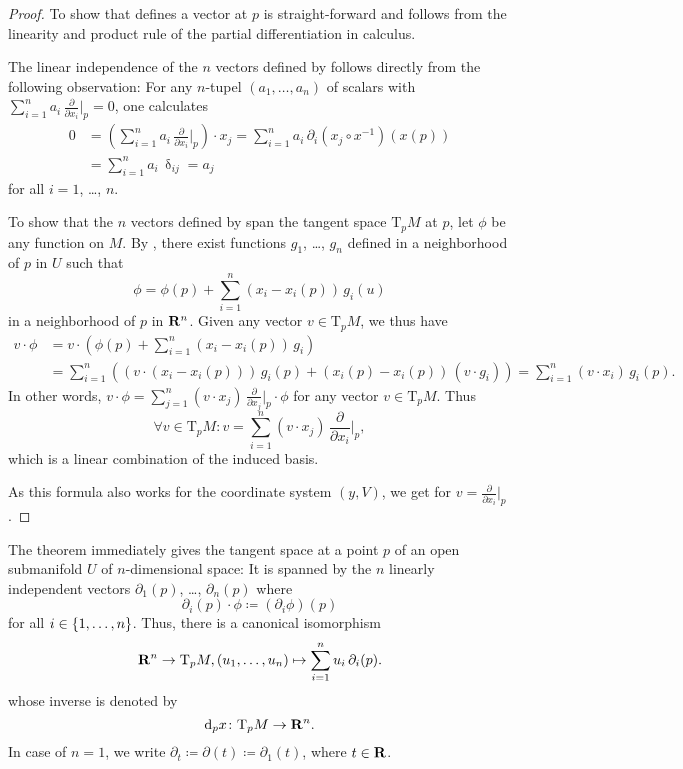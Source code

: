 \begin{proof}
  To show that  defines a vector at $p$ is
  straight-forward and follows from the linearity and product rule of the
  partial differentiation in calculus.
  
  The linear independence of the $n$ vectors defined by
   follows directly from the following
  observation: For any $n$-tupel $(a_1, \dotsc, a_n)$ of
  scalars with $\sum_{i = 1}^n a_i \, \frac\partial{\partial x_i}|_p = 0$, one
  calculates
  \[
    \begin{split}
      0 & = \left(\sum_{i = 1}^n a_i \, \frac\partial{\partial x_i}|_p\right) \cdot x_j
      = \sum_{i = 1}^n a_i \, \partial_i (x_j \circ x^{-1}) (x(p)) \\
      & = \sum_{i = 1}^n a_i \, \updelta_{ij}
      = a_j
    \end{split}
  \]
  for all $i = 1$, \dots, $n$.
  
  To show that the $n$ vectors defined by  span
  the tangent space $\mathrm T_p M$ at $p$, let $\phi$ be any function on $M$. By
  , there exist functions $g_1$, \dots, $g_n$ defined
  in a neighborhood of $p$ in $U$ such that
  \[
    \phi = \phi(p) + \sum_{i = 1}^n (x_i - x_i(p)) \, g_i(u)
  \]
  in a neighborhood of $p$ in $\mathbf{R}^n$. Given any vector $v \in
  \mathrm T_p M$, we thus have
  \[
    \begin{split}
      v \cdot \phi & = v \cdot (\phi(p) + \sum_{i = 1}^n (x_i - x_i(p)) \, g_i) \\
      & = \sum_{i = 1}^n \left((v \cdot (x_i - x_i(p))) \, g_i(p) + (x_i(p) - x_i(p)) \, (v \cdot g_i)\right)
      = \sum_{i = 1}^n (v \cdot x_i) \, g_i(p).
    \end{split}
  \]
  In other words, $v \cdot \phi = \sum_{j = 1}^n (v \cdot x_j) \, \frac\partial{\partial x_j}|_p \cdot \phi$
  for any vector $v \in \mathrm T_p M$. Thus
  \[
    \forall v \in \mathrm T_p M: v = \sum_{i = 1}^n (v \cdot x_j) \, \frac\partial{\partial x_i}|_p,
  \] 
  which is a linear combination of the induced basis.
  
  As this formula also works for the coordinate system $(y, V)$, we get
   for $v = \frac\partial{\partial x_i}|_p$.
\end{proof}

The theorem immediately gives the tangent space at a point $p$ of an open
submanifold $U$ of $n$-dimensional space: It is spanned by the $n$ linearly 
independent vectors $\partial_1(p)$, \dots, $\partial_n(p)$ where
\[
  \partial_i(p) \cdot \phi \coloneqq (\partial_i \phi) (p)
\]
for all $i \in \lbrace1, \dotsc, n\rbrace$. Thus, there is a canonical isomorphism
\[
  \mathbf{R}^n \to \mathrm T_p M,
  (u_1, \dotsc, u_n) \mapsto \sum_{i = 1}^n u_i \, \partial_i(p).
\]
whose inverse is denoted by
\[
  \mathrm d_p x\colon \mathrm T_p M \to \mathbf{R}^n.
\]
In case of $n = 1$, we write $\partial_t \coloneqq \partial(t) \coloneqq
\partial_1(t)$, where $t \in \mathbf{R}$.


